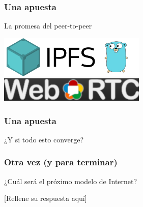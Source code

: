 \begin{frame}[fragile]
  \frametitle{Una apuesta}

  La promesa del peer-to-peer

  \begin{center}
  \includegraphics[width=7cm]{figs/ipfs}
  \includegraphics[width=7cm]{figs/webrtc}
  \end{center}
  
\end{frame}

\begin{frame}[fragile]
  \frametitle{Una apuesta}

  \begin{center}
  {\Large
  ¿Y si todo esto converge?
  }
  \end{center}
\end{frame}


\begin{frame}[fragile]
  \frametitle{Otra vez (y para terminar)}


  ¿Cuál será el próximo modelo de Internet?

  \vspace{2cm}
  
  [Rellene su respuesta aquí]
  
\end{frame}
